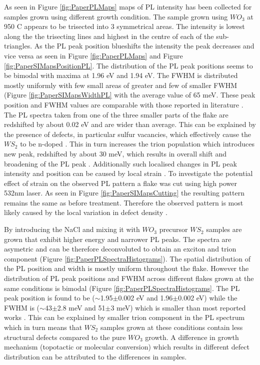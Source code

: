 As seen in Figure \ref{fig:PaperPLMaps} maps of PL intensity has been collected for samples grown using different growth condition. The sample grown using $WO_3$ at 950 {\degree}C appears to be trisected into 3 symmetrical areas. The intensity is lowest along the the trisecting lines and highest in the centre of each of the sub-triangles. As the PL peak position blueshifts the intensity the peak decreases and vice versa as seen in Figure \ref{fig:PaperPLMaps} and Figure \ref{fig:PaperSIMapsPositionPL}. The distribution of the PL peak positions seems to be bimodal with maxima at 1.96 eV and 1.94 eV. The FWHM is distributed mostly uniformly with few small areas of greater and few of smaller FWHM (Figure \ref{fig:PaperSIMapsWidthPL} with the average value of 65 meV. These peak position and FWHM values are comparable with those reported in literature \cite{ExtraordinaryRoomTemperaturePhotoluminescenceInTriangularWS2Monolayers}\cite{Rong2014}\cite{Hu2016}\cite{Kang2015a}. The PL spectra taken from one of the three smaller parts of the flake are redshifted by about 0.02 eV and are wider than average. This can be explained by the presence of defects, in particular sulfur vacancies, which effectively cause the $WS_2$ to be n-doped \cite{Hui2013}\cite{Peimyoo2014}. This in turn increases the trion population which introduces new peak, redshifted by about 30 meV, which results in overall shift and broadening of the PL peak \cite{Tongay2013}\cite{ExtraordinaryRoomTemperaturePhotoluminescenceInTriangularWS2Monolayers}. Additionally such localised changes in PL peak intensity and position can be caused by local strain \cite{Liu2014}\cite{Hui2013}. To investigate the potential effect of strain on the observed PL pattern a flake was cut using high power 532nm laser. As seen in Figure \ref{fig:PaperSIMapsCutting} the resulting pattern remains the same as before treatment. Therefore the observed pattern is most likely caused by the local variation in defect density \cite{Liu2016}.

By introducing the NaCl and mixing it with $WO_3$ precursor $WS_2$ samples are grown that exhibit higher energy and narrower PL peaks. The spectra are asymetric and can be therefore deconvoluted to obtain an exciton and trion component (Figure \ref{fig:PaperPLSpectraHistograms}). The spatial distribution of the PL position and width is mostly uniform throughout the flake. However the distribution of PL peak positions and FWHM across different flakes grown at the same conditions is bimodal (Figure \ref{fig:PaperPLSpectraHistograms}. The PL peak position is found to be ({$\sim$}1.95{$\pm$}0.002 eV and 1.96{$\pm$}0.002 eV) while the FWHM is ({$\sim$}43{$\pm$}2.8 meV and 51{$\pm$}3 meV) which is smaller than most reported works \cite{ExtraordinaryRoomTemperaturePhotoluminescenceInTriangularWS2Monolayers}\cite{Rong2014}\cite{Hu2016}\cite{Kang2015a}. This can be explained by smaller trion component in the PL spectrum which in turn means that $WS_2$ samples grown at these conditions contain less structural defects compared to the pure $WO_3$ growth. A difference in growth mechanism (topotactic or molecular conversion) which results in different defect distribution can be attributed to the differences in samples.

